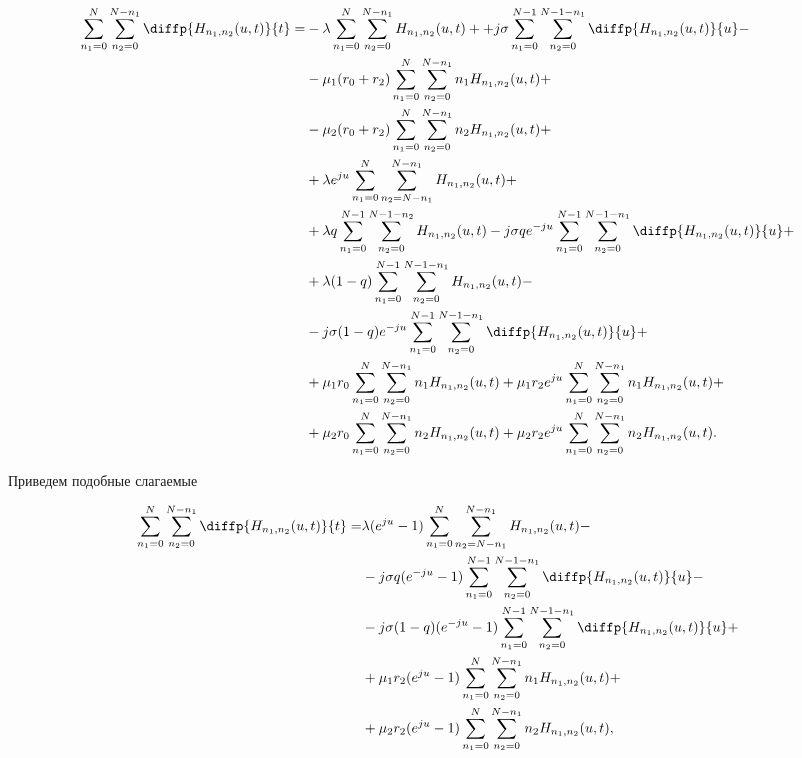 \begin{equation*}
\begin{aligned}
	\sum_{n_1=0}^N\sum_{n_2=0}^{N-n_1} \diffp{H_{n_1,n_2}(u,t)}{t}=
	&-\lambda \sum_{n_1=0}^N\sum_{n_2=0}^{N-n_1} H_{n_1, n_2}(u,t)+
	 +j\sigma \sum_{n_1=0}^{N-1}\sum_{n_2=0}^{N-1-n_1} 
	 \diffp{H_{n_1, n_2}(u,t)}{u}-\\
	&-\mu_1 (r_0+r_2) \sum_{n_1=0}^N\sum_{n_2=0}^{N-n_1} n_1 H_{n_1, n_2}(u,t)+\\
	&-\mu_2 (r_0+r_2)\sum_{n_1=0}^N\sum_{n_2=0}^{N-n_1} n_2 H_{n_1, n_2}(u,t)+\\
	&+\lambda e^{ju}\sum_{n_1=0}^N\sum_{n_2=N-n_1}^{N-n_1} 
	  H_{n_1, n_2}(u,t)+\\
	&+\lambda q \sum_{n_1=0}^{N-1}\sum_{n_2=0}^{N-1-n_2} 
	  H_{n_1, n_2}(u,t)
	 -j \sigma q e^{-ju} \sum_{n_1=0}^{N-1}\sum_{n_2=0}^{N-1-n_1} 
	   \diffp{H_{n_1, n_2}(u,t)}{u}+\\
	&+\lambda (1-q) \sum_{n_1=0}^{N-1}\sum_{n_2=0}^{N-1-n_1} 
	  H_{n_1, n_2}(u,t)-\\
	  &-j \sigma (1-q) e^{-ju}\sum_{n_1=0}^{N-1}\sum_{n_2=0}^{N-1-n_1} 
	  \diffp{H_{n_1, n_2}(u,t)}{u}+\\
	&+\mu_1 r_0 \sum_{n_1=0}^N\sum_{n_2=0}^{N-n_1} 
	  n_1 H_{n_1, n_2}(u,t)
	+\mu_1 r_2 e^{ju}\sum_{n_1=0}^{N}\sum_{n_2=0}^{N-n_1} 
	  n_1 H_{n_1, n_2}(u,t)+\\
	&+\mu_2 r_0 \sum_{n_1=0}^N\sum_{n_2=0}^{N-n_1} 
	  n_2 H_{n_1, n_2}(u,t)
	 +\mu_2 r_2 e^{ju}\sum_{n_1=0}^{N}\sum_{n_2=0}^{N-n_1} 
	  n_2 H_{n_1, n_2}(u,t).\\
\end{aligned}
\end{equation*}

Приведем подобные слагаемые 

\begin{equation*}
\begin{aligned}
	\sum_{n_1=0}^N\sum_{n_2=0}^{N-n_1} \diffp{H_{n_1,n_2}(u,t)}{t}=
	&\lambda (e^{ju} - 1)\sum_{n_1=0}^N\sum_{n_2=N-n_1}^{N-n_1} 
	  H_{n_1, n_2}(u,t)-\\
	&-j \sigma q (e^{-ju}-1) \sum_{n_1=0}^{N-1}\sum_{n_2=0}^{N-1-n_1} 
	   \diffp{H_{n_1, n_2}(u,t)}{u}-\\
	&-j \sigma (1-q) (e^{-ju}-1)\sum_{n_1=0}^{N-1}\sum_{n_2=0}^{N-1-n_1} 
	  \diffp{H_{n_1, n_2}(u,t)}{u}+\\
	&+\mu_1 r_2 (e^{ju} -1)\sum_{n_1=0}^{N}\sum_{n_2=0}^{N-n_1} 
	n_1 H_{n_1, n_2}(u,t)+\\
	&+\mu_2 r_2 (e^{ju} -1)\sum_{n_1=0}^{N}\sum_{n_2=0}^{N-n_1} 
	n_2 H_{n_1, n_2}(u,t),\\
\end{aligned}
\end{equation*}

